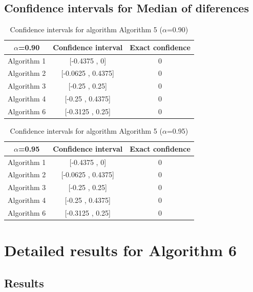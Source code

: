 \documentclass[a4paper,10pt]{article}
\begin{document}
\subsection{Confidence intervals for Median of diferences}

\begin{table}[!htp]
\centering\small
\begin{tabular}{
|c|c|c|}
\hline
 $\alpha$=0.90 & Confidence interval & Exact confidence \\ \hline 
Algorithm 1 & [-0.4375 , 0] & 0\\ \hline 
Algorithm 2 & [-0.0625 , 0.4375] & 0\\ \hline 
Algorithm 3 & [-0.25 , 0.25] & 0\\ \hline 
Algorithm 4 & [-0.25 , 0.4375] & 0\\ \hline 
Algorithm 6 & [-0.3125 , 0.25] & 0\\ \hline 

\end{tabular}
\caption{Confidence intervals for algorithm Algorithm 5 ($\alpha$=0.90)}
\end{table}
\begin{table}[!htp]
\centering\small
\begin{tabular}{
|c|c|c|}
\hline
 $\alpha$=0.95 & Confidence interval & Exact confidence \\ \hline 
Algorithm 1 & [-0.4375 , 0] & 0\\ \hline 
Algorithm 2 & [-0.0625 , 0.4375] & 0\\ \hline 
Algorithm 3 & [-0.25 , 0.25] & 0\\ \hline 
Algorithm 4 & [-0.25 , 0.4375] & 0\\ \hline 
Algorithm 6 & [-0.3125 , 0.25] & 0\\ \hline 

\end{tabular}
\caption{Confidence intervals for algorithm Algorithm 5 ($\alpha$=0.95)}
\end{table}

 \clearpage 


\section{Detailed results for Algorithm 6}


\subsection{Results}
\end{document}
